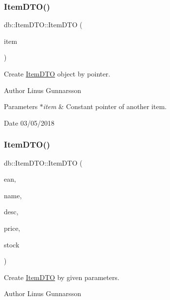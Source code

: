 \subsubsection{\texorpdfstring{Item\+D\+T\+O()}{ItemDTO()}\hspace{0.1cm}{\footnotesize\ttfamily [1/2]}}
{\footnotesize\ttfamily db\+::\+Item\+D\+T\+O\+::\+Item\+D\+TO (\begin{DoxyParamCaption}\item[{const \mbox{\hyperlink{classdb_1_1ItemDTO}{Item\+D\+TO}} $\ast$}]{item }\end{DoxyParamCaption})\hspace{0.3cm}{\ttfamily [inline]}}

Create \mbox{\hyperlink{classdb_1_1ItemDTO}{Item\+D\+TO}} object by pointer. \begin{DoxyAuthor}{Author}
Linus Gunnarsson 
\end{DoxyAuthor}

\begin{DoxyParams}{Parameters}
{\em $\ast$item} & Constant pointer of another item. \\
\hline
\end{DoxyParams}
\begin{DoxyDate}{Date}
03/05/2018 
\end{DoxyDate}
\mbox{\label{classdb_1_1ItemDTO_a0769007cb2c7fa59e9cd61b577a3129c}} 
\subsubsection{\texorpdfstring{Item\+D\+T\+O()}{ItemDTO()}\hspace{0.1cm}{\footnotesize\ttfamily [2/2]}}
{\footnotesize\ttfamily db\+::\+Item\+D\+T\+O\+::\+Item\+D\+TO (\begin{DoxyParamCaption}\item[{std\+::string}]{ean,  }\item[{std\+::string}]{name,  }\item[{std\+::string}]{desc,  }\item[{double}]{price,  }\item[{int}]{stock }\end{DoxyParamCaption})\hspace{0.3cm}{\ttfamily [inline]}}

Create \mbox{\hyperlink{classdb_1_1ItemDTO}{Item\+D\+TO}} by given parameters. \begin{DoxyAuthor}{Author}
Linus Gunnarsson 
\end{DoxyAuthor}

